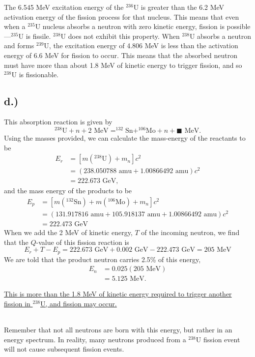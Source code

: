 \documentclass{report}
\begin{document}
The 6.545 MeV excitation energy of the $^{236}$U is greater than the 6.2 MeV activation energy of the fission process for that nucleus. This means that even when a $^{235}$U nucleus absorbs a neutron with zero kinetic energy, fission is possible---$^{235}$U is fissile. $^{238}$U does not exhibit this property. When $^{238}$U absorbs a neutron and forms $^{239}$U, the excitation energy of 4.806 MeV is less than the activation energy of 6.6 MeV for fission to occur. This means that the absorbed neutron must have more than about 1.8 MeV of kinetic energy to trigger fission, and so $^{238}$U is fissionable.


\subsection*{d.)}

This absorption reaction is given by
$$ ^{238}\text{U} + n + 2\text{ MeV} = ^{132}\text{Sn} + ^{106}\text{Mo} + n + \blacksquare\text{ MeV} .$$
Using the masses provided, we can calculate the mass-energy of the reactants to be
\begin{align*}
E_r	&= \left[m(^{238}\text{U}) + m_n\right]c^2 \\
	&= \left(238.050788\text{ amu} + 1.00866492\text{ amu}\right)c^2 \\
	&= 222.673\text{ GeV},
\end{align*}
and the mass energy of the products to be
\begin{align*}
E_p	&= \left[m(^{132}\text{Sn}) + m(^{106}\text{Mo}) + m_n\right]c^2 \\
	&= \left(131.917816\text{ amu} + 105.918137\text{ amu} + 1.00866492\text{ amu}\right)c^2 \\
	&= 222.473\text{ GeV}
\end{align*}
When we add the 2 MeV of kinetic energy, $T$ of the incoming neutron, we find that the $Q$-value of this fission reaction is
$$ E_r + T - E_p = 222.673\text{ GeV}
 + 0.002\text{ GeV} - 222.473\text{ GeV} = 205\text{ MeV} $$
We are told that the product neutron carries 2.5\% of this energy,
\begin{align*}
E_n	&= 0.025(205\text{ MeV}) \\
	&= 5.125\text{ MeV}. 
\end{align*}

\underline{This is more than the 1.8 MeV of kinetic energy required to trigger another fission in $^{238}$U, and fission may occur.}

\-\\
{\small *Remember that not all neutrons are born with this energy, but rather in an energy spectrum. In reality, many neutrons produced from a $^{238}$U fission event will not cause subsequent fission events.} 
\end{document}
